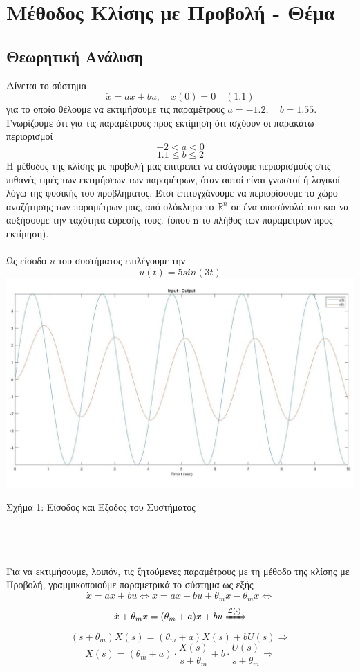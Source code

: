 \documentclass[12pt]{article}
\newcommand{\Lagr}{\mathcal{L}}
\begin{document}
\newpage
\section{Μέθοδος Κλίσης με Προβολή - Θέμα}
\subsection{Θεωρητική Ανάλυση}
Δίνεται το σύστημα
\[ \dot{x}=ax+bu , \quad x(0)=0 \quad (1.1)\]
για το οποίο θέλουμε να εκτιμήσουμε τις παραμέτρους $a=-1.2 ,\quad b=1.55$.
Γνωρίζουμε ότι για τις παραμέτρους προς εκτίμηση ότι ισχύουν οι παρακάτω περιορισμοί
\[-2<a<0 \]
\[ 1.1 \leq b \leq 2  \]
Η μέθοδος της κλίσης με προβολή μας επιτρέπει να εισάγουμε περιορισμούς στις πιθανές τιμές των εκτιμήσεων των παραμέτρων, όταν αυτοί είναι γνωστοί ή λογικοί λόγω της φυσικής του προβλήματος. Έτσι επιτυγχάνουμε να περιορίσουμε το χώρο αναζήτησης των παραμέτρων μας, από ολόκληρο το $\mathbb{R}^n$ σε ένα υποσύνολό του και να αυξήσουμε την ταχύτητα εύρεσής τους. (όπου n το πλήθος των παραμέτρων προς εκτίμηση).
\\ \\ 
Ως είσοδο $u$ του συστήματος επιλέγουμε την
\[u(t)=5sin(3t)\]
\includegraphics[width=\linewidth]{inpOut.jpg}
\centerline{Σχήμα 1: Είσοδος και Έξοδος του Συστήματος}
\\ \\ \\
Για να εκτιμήσουμε, λοιπόν, τις ζητούμενες παραμέτρους με τη μέθοδο της κλίσης με Προβολή, γραμμικοποιούμε παραμετρικά το σύστημα ως εξής
\[ \dot{x}=ax+bu \Leftrightarrow \dot{x}=ax+bu+\theta_mx-\theta_mx \Leftrightarrow\]
\[\dot{x}+\theta_mx=(\theta_m+a)x+bu \xRightarrow{\Lagr(\cdot)} \]
\[ (s+\theta_m)X(s)=(\theta_m+a)X(s)+bU(s) \Rightarrow\]
\[ X(s)=(\theta_m+a)\cdot \frac{ X(s)}{s+\theta_m} +b \cdot \frac{U(s)}{s+\theta_m} \Rightarrow \]
\end{document}

